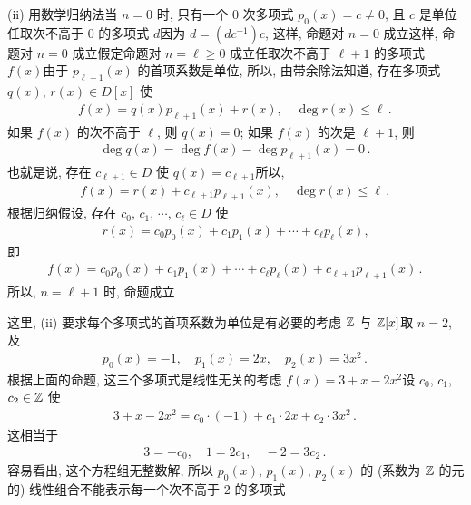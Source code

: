 \begin{pf}
    (ii) 用数学归纳法\period 当 $n=0$ 时, 只有一个 $0$ 次多项式 $p_0 (x) = c \neq 0$, 且 $c$ 是单位\period 任取次不高于 $0$ 的多项式 $d$\period 因为 $d = (dc^{-1})c$, 这样, 命题对 $n=0$ 成立\period 这样, 命题对 $n=0$ 成立\period 假定命题对 $n = \ell \geq 0$ 成立\period 任取次不高于 $\ell + 1$ 的多项式 $f(x)$\period 由于 $p_{\ell + 1} (x)$ 的首项系数是单位, 所以, 由带余除法知道, 存在多项式 $q(x)$, $r(x) \in D[x]$ 使
    \begin{align*}
        f(x) = q(x) p_{\ell + 1} (x) + r(x), \quad \deg r(x) \leq \ell \period
    \end{align*}
    如果 $f(x)$ 的次不高于 $\ell$, 则 $q(x) = 0$; 如果 $f(x)$ 的次是 $\ell + 1$, 则
    \begin{align*}
        \deg q(x) = \deg f(x) - \deg p_{\ell+1} (x) = 0 \period
    \end{align*}
    也就是说, 存在 $c_{\ell + 1} \in D$ 使 $q(x) = c_{\ell + 1}$\period 所以,
    \begin{align*}
        f(x) = r(x) + c_{\ell + 1} p_{\ell + 1} (x), \quad \deg r(x) \leq \ell \period
    \end{align*}
    根据归纳假设, 存在 $c_0$, $c_1$, $\cdots$, $c_{\ell} \in D$ 使
    \begin{align*}
        r(x) = c_0 p_0 (x) + c_1 p_1 (x) + \cdots + c_{\ell} p_{\ell} (x),
    \end{align*}
    即
    \begin{align*}
        f(x) = c_0 p_0 (x) + c_1 p_1 (x) + \cdots + c_{\ell} p_{\ell} (x) + c_{\ell + 1} p_{\ell + 1} (x) \period
    \end{align*}
    所以, $n = \ell + 1$ 时, 命题成立\period
\end{pf}

\begin{remark}
    这里, (ii) 要求每个多项式的首项系数为单位是有必要的\period 考虑 $\mathbb{Z}$ 与 $\mathbb{Z}[x]$\period 取 $n=2$, 及
    \begin{align*}
        p_0 (x) = -1, \quad p_1 (x) = 2x, \quad p_2 (x) = 3x^2 \period
    \end{align*}
    根据上面的命题, 这三个多项式是线性无关的\period 考虑 $f(x) = 3 + x - 2x^2$\period 设 $c_0$, $c_1$, $c_2 \in \mathbb{Z}$ 使
    \begin{align*}
        3 + x - 2x^2 = c_0 \cdot (-1) + c_1 \cdot 2x + c_2 \cdot 3x^2 \period
    \end{align*}
    这相当于
    \begin{align*}
        3 = -c_0, \quad 1 = 2c_1, \quad -2 = 3c_2 \period
    \end{align*}
    容易看出, 这个方程组无整数解, 所以 $p_0 (x)$, $p_1 (x)$, $p_2 (x)$ 的 (系数为 $\mathbb{Z}$ 的元的) 线性组合不能表示每一个次不高于 $2$ 的多项式\period
\end{remark}

